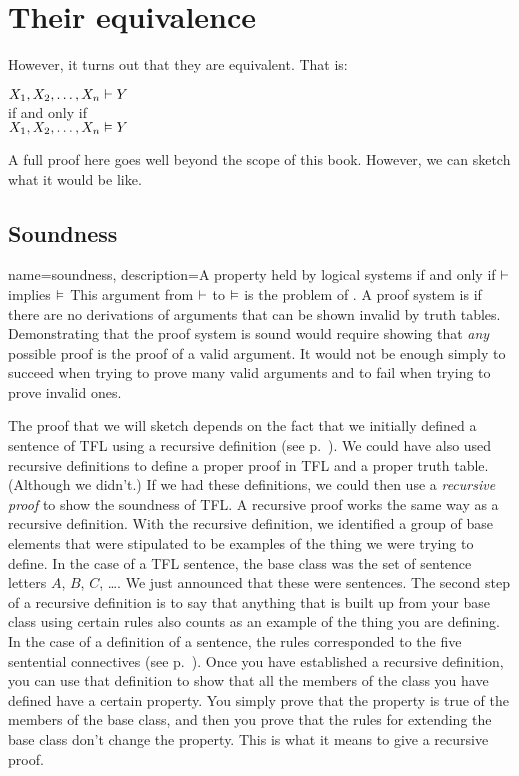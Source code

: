 \section{Their equivalence}
However, it turns out that they are equivalent. 
That is:
\begin{center}
$X_1, X_2, \ldots, X_n \vdash Y$\\if and only if\\
$X_1, X_2, \ldots, X_n \vDash Y$
\end{center}
A full proof here goes well beyond the scope of this book. However, we can sketch what it would be like.

\subsection{Soundness}

{
name=soundness,
description={A property held by logical systems if and only if $\vdash $ implies $\vDash $}
}
This argument from $\vdash $ to $\vDash $ is the problem of . \label{def:soundness} A proof system is  if there are no derivations of arguments that can be shown invalid by truth tables. \label{def_Soundness} Demonstrating that the proof system is sound would require showing that \emph{any} possible proof is the proof of a valid argument. It would not be enough simply to succeed when trying to prove many valid arguments and to fail when trying to prove invalid ones.

The proof that we will sketch depends on the fact that we initially defined a sentence of TFL using a recursive definition (see p.~\pageref{TFLsentences}). We could have also used recursive definitions to define a proper proof in TFL and a proper truth table. (Although we didn't.) If we had these definitions, we could then use a \emph{recursive proof} to show the soundness of TFL. A recursive proof works the same way as a recursive definition. With the recursive definition, we identified a group of base elements that were stipulated to be examples of the thing we were trying to define. In the case of a TFL sentence, the base class was the set of sentence letters $A$, $B$, $C$, \dots. We just announced that these were sentences. The second step of a recursive definition is to say that anything that is built up from your base class using certain rules also counts as an example of the thing you are defining. In the case of a definition of a sentence, the rules corresponded to the five sentential connectives (see p.~\pageref{TFLsentences}). Once you have established a recursive definition, you can use that definition to show that all the members of the class you have defined have a certain property. You simply prove that the property is true of the members of the base class, and then you prove that the rules for extending the base class don't change the property. This is what it means to give a recursive proof.

